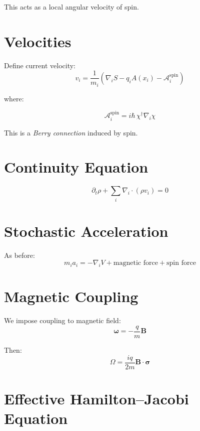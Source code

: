 \documentclass[11pt]{article}
\begin{document}
This acts as a local angular velocity of spin.

\section{Velocities}

Define current velocity:
\begin{equation}
v_i = \frac{1}{m_i}\left( \nabla_i S - q_i A(x_i) - \mathcal{A}_i^{\text{spin}} \right)
\end{equation}

where:

\begin{equation}
\mathcal{A}_i^{\text{spin}} = i \hbar \, \chi^\dagger \nabla_i \chi
\end{equation}

This is a \emph{Berry connection} induced by spin.

\section{Continuity Equation}

\begin{equation}
\partial_t \rho + \sum_i \nabla_i \cdot (\rho v_i) = 0
\end{equation}

\section{Stochastic Acceleration}

As before:
\begin{equation}
m_i a_i = -\nabla_i V + \text{magnetic force} + \text{spin force}
\end{equation}

\section{Magnetic Coupling}

We impose coupling to magnetic field:
\begin{equation}
\bm{\omega} = -\frac{q}{m} \mathbf{B}
\end{equation}

Then:
\begin{equation}
\Omega = \frac{i q}{2m} \mathbf{B}\cdot \bm{\sigma}
\end{equation}

\section{Effective Hamilton--Jacobi Equation}
\end{document}
